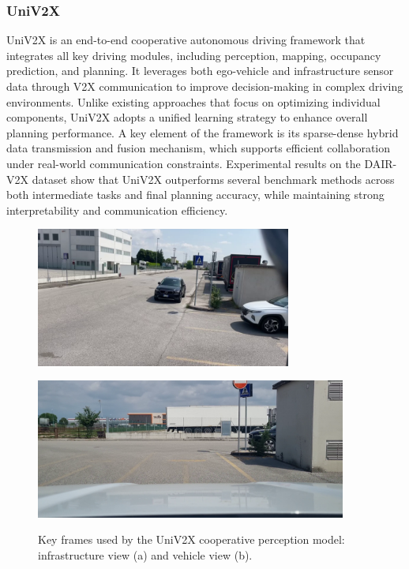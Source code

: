 \subsubsection{UniV2X}

UniV2X is an end-to-end cooperative autonomous driving framework that integrates all key driving modules, including perception, mapping, occupancy prediction, and planning. 
It leverages both ego-vehicle and infrastructure sensor data through V2X communication to improve decision-making in complex driving environments. 
Unlike existing approaches that focus on optimizing individual components, UniV2X adopts a unified learning strategy to enhance overall planning performance. 
A key element of the framework is its sparse-dense hybrid data transmission and fusion mechanism, which supports efficient collaboration under real-world communication constraints. 
Experimental results on the DAIR-V2X \cite{DAIR-V2X2021} dataset show that UniV2X outperforms several benchmark methods across both intermediate tasks and final planning accuracy, while maintaining strong interpretability and communication efficiency.

\begin{figure}[ht]
  \centering
  \begin{minipage}[t]{0.48\linewidth}
    \includegraphics[width=\linewidth,height=130pt]{figures/introduction/univ2x_infra.png}
    \label{fig:univ2x_infra}
  \end{minipage}\hfill
  \begin{minipage}[t]{0.48\linewidth}
    \includegraphics[width=\linewidth,height=130pt]{figures/introduction/univ2x_veh.png}
    \label{fig:univ2x_veh}
  \end{minipage}
  \caption{Key frames used by the UniV2X cooperative perception model: infrastructure view (a) and vehicle view (b).}
  \label{fig:univ2x_frames}
\end{figure}


